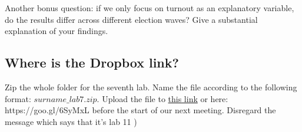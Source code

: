 \documentclass{article}\usepackage[]{graphicx}\usepackage[]{color}
\begin{document}
Another bonus question: if we only focus on turnout as an explanatory variable, do the results differ across different election waves? Give a substantial explanation of your findings.


\subsection*{Where is the Dropbox link?}

Zip the whole folder for the seventh lab. Name the file according to the following format: $surname\_lab7.zip$. Upload the file to \href{https://www.dropbox.com/request/4wIEMUItR5v7ZNBYIUJ4}{this link} or here: https://goo.gl/6SyMxL before the start of our next meeting. Disregard the message which says that it's lab 11 \;)
\end{document}
